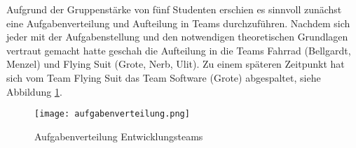 Aufgrund der Gruppenstärke von fünf Studenten erschien es sinnvoll zunächst eine Aufgabenverteilung und Aufteilung in Teams durchzuführen.
Nachdem sich jeder mit der Aufgabenstellung und den notwendigen theoretischen Grundlagen vertraut gemacht hatte geschah die Aufteilung in die Teams Fahrrad (Bellgardt, Menzel) und Flying Suit (Grote, Nerb, Ulit).
Zu einem späteren Zeitpunkt hat sich vom Team Flying Suit das Team Software (Grote) abgespaltet, siehe Abbildung \ref{fig:aufgabenverteilung}.


\begin{figure}[h]
    \begin{center}
        \texttt{[image: aufgabenverteilung.png]}
        \caption[Aufgabenverteilung Entwicklungsteams (Abbildungsverzeichnis)]{Aufgabenverteilung Entwicklungsteams
        }
        \label{fig:aufgabenverteilung}
    \end{center}
\end{figure}